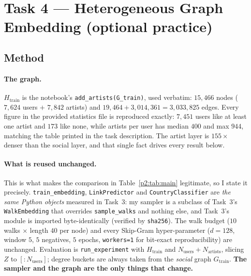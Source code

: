 \section{Task 4 --- Heterogeneous Graph Embedding (optional practice)}
\label{p2:sec:main}

\subsection{Method}
\label{p2:sec:method}

\paragraph{The graph.}
$H_{\mathrm{train}}$ is the notebook's \texttt{add\_artists(G\_train)}, used verbatim:
$15{,}466$ nodes ($7{,}624$ users $+$ $7{,}842$ artists) and
$19{,}464 + 3{,}014{,}361 = 3{,}033{,}825$ edges.  Every figure in the provided
statistics file is reproduced exactly: $7{,}451$ users like at least one artist and
$173$ like none, while artists per user has median $400$ and max $944$, matching the
table printed in the task description.  The artist layer is $155\times$ denser
than the social layer, and that single fact drives every result below.

\paragraph{What is reused unchanged.}
This is what makes the comparison in Table~\ref{p2:tab:main} legitimate, so I state it
precisely.  \texttt{train\_embedding}, \texttt{LinkPredictor} and
\texttt{CountryClassifier} are \emph{the same Python objects} measured in Task~3: my
sampler is a subclass of Task~3's \texttt{WalkEmbedding} that overrides
\texttt{sample\_walks} and nothing else, and Task~3's module is imported byte-identically
(verified by \texttt{sha256}).  The walk budget ($10$ walks $\times$ length $40$ per
node) and every Skip-Gram hyper-parameter ($d{=}128$, window $5$, $5$ negatives,
$5$ epochs, \texttt{workers=1} for bit-exact reproducibility) are unchanged.  Evaluation
is \texttt{run\_experiment} with $H_{\mathrm{train}}$ and $N_{\mathrm{users}}+N_{\mathrm{artists}}$,
slicing $Z$ to $[:N_{\mathrm{users}}]$; degree buckets are always taken from the
\emph{social} graph $G_{\mathrm{train}}$.  \textbf{The sampler and the graph are the only
things that change.}

